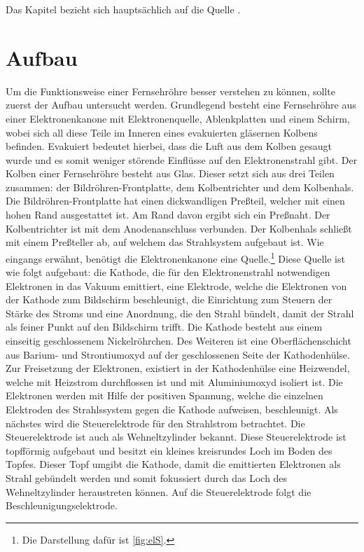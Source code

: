 Das Kapitel bezieht sich hauptsächlich auf die Quelle \cite{Fernsehroehre}.
\section{Aufbau}
\label{sec:aufbau}
Um die Funktionsweise einer Fernsehröhre besser verstehen zu können, sollte zuerst der Aufbau untersucht werden.
Grundlegend besteht eine Fernsehröhre aus einer Elektronenkanone mit Elektronenquelle, Ablenkplatten und einem Schirm, wobei sich all diese Teile im Inneren eines evakuierten gläsernen Kolbens befinden.
Evakuiert bedeutet hierbei, dass die Luft aus dem Kolben gesaugt wurde und es somit weniger störende Einflüsse auf den Elektronenstrahl gibt.
Der Kolben einer Fernsehröhre besteht aus Glas.
Dieser setzt sich aus drei Teilen zusammen: der Bildröhren-Frontplatte, dem Kolbentrichter und dem Kolbenhals.
Die Bildröhren-Frontplatte hat einen dickwandligen Preßteil, welcher mit einen hohen Rand ausgestattet ist.
Am Rand davon ergibt sich ein Preßnaht.
Der Kolbentrichter ist mit dem Anodenanschluss verbunden.
Der Kolbenhals schließt mit einem Preßteller ab, auf welchem das Strahlsystem aufgebaut ist.
Wie eingangs erwähnt, benötigt die Elektronenkanone eine Quelle.\footnote{Die Darstellung dafür ist \ref{fig:elS}.}
Diese Quelle ist wie folgt aufgebaut: die Kathode, die für den Elektronenstrahl notwendigen Elektronen in das Vakuum emittiert, eine Elektrode, welche die Elektronen von der Kathode zum Bildschirm beschleunigt, die Einrichtung zum Steuern der Stärke des Stroms und eine Anordnung, die den Strahl bündelt, damit der Strahl als feiner Punkt auf den Bildschirm trifft. 
Die Kathode besteht aus einem einseitig geschlossenem Nickelröhrchen.
Des Weiteren ist eine Oberflächenschicht aus Barium- und Strontiumoxyd auf der geschlossenen Seite der Kathodenhülse.
Zur Freisetzung der Elektronen, existiert in der Kathodenhülse eine Heizwendel, welche mit Heizstrom durchflossen ist und mit Aluminiumoxyd isoliert ist.
Die Elektronen werden mit Hilfe der positiven Spannung, welche die einzelnen Elektroden des Strahlssystem gegen die Kathode aufweisen, beschleunigt.
Als nächstes wird die Steuerelektrode für den Strahlstrom betrachtet.
Die Steuerelektrode ist auch als Wehneltzylinder bekannt.
Diese Steuerelektrode ist topfförmig aufgebaut und besitzt ein kleines kreisrundes Loch im Boden des Topfes.
Dieser Topf umgibt die Kathode, damit die emittierten Elektronen als Strahl gebündelt werden und somit fokussiert durch das Loch des Wehneltzylinder heraustreten können.
Auf die Steuerelektrode folgt die Beschleunigungselektrode.
